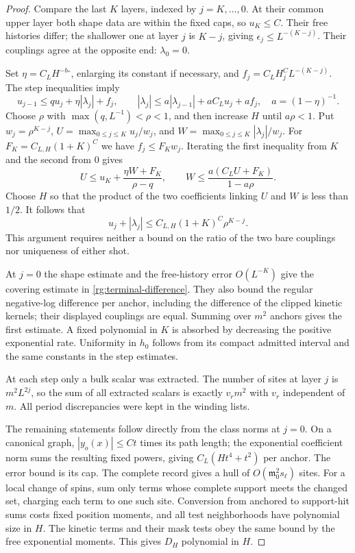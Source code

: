 \begin{proof}
Compare the last $K$ layers, indexed by $j=K,\ldots,0$.
At their common upper layer both shape data are within the
fixed caps, so $u_K\le C$.  Their free histories differ;
the shallower one at layer $j$ is $K-j$, giving
$\epsilon_j\le L^{-(K-j)}$.  Their couplings agree at the
opposite end: $\lambda_0=0$.

Set $\eta=C_LH^{-b_*}$, enlarging its constant if necessary,
and $f_j=C_LH_j^CL^{-(K-j)}$.  The step inequalities imply
\[
 u_{j-1}\le q u_j+\eta|\lambda_j|+f_j,\qquad
 |\lambda_j|\le
 a|\lambda_{j-1}|+aC_Lu_j+af_j,\quad
 a=(1-\eta)^{-1}.
\]
Choose $\rho$ with $\max(q,L^{-1})<\rho<1$, and then
increase $H$ until $a\rho<1$.  Put
$w_j=\rho^{K-j}$,
$U=\max_{0\le j\le K}u_j/w_j$, and
$W=\max_{0\le j\le K}|\lambda_j|/w_j$.
For $F_K=C_{L,H}(1+K)^C$ we have $f_j\le F_Kw_j$.
Iterating the first inequality from $K$ and the second
from $0$ gives
\[
 U\le u_K+\frac{\eta W+F_K}{\rho-q},\qquad
 W\le\frac{a(C_LU+F_K)}{1-a\rho}.
\]
Choose $H$ so that the product of the two coefficients
linking $U$ and $W$ is less than $1/2$.
It follows that
\begin{equation}
 u_j+|\lambda_j|
       \le C_{L,H}(1+K)^C\rho^{K-j}.
 \label{rg:two-end-bound}
\end{equation}
This argument requires neither a bound on the ratio of
the two bare couplings nor uniqueness of either shot.

At $j=0$ the shape estimate and the free-history error
$O(L^{-K})$ give the covering estimate in
\eqref{rg:terminal-difference}.  They also bound the
regular negative-log difference per anchor, including
the difference of the clipped kinetic kernels; their
displayed couplings are equal.  Summing over $m^2$ anchors
gives the first estimate.  A fixed polynomial in $K$
is absorbed by decreasing the positive exponential rate.
Uniformity in $h_0$ follows from its compact admitted
interval and the same constants in the step estimates.

At each step only a bulk scalar was extracted.  The number
of sites at layer $j$ is $m^2L^{2j}$, so the sum of all
extracted scalars is exactly $v_rm^2$ with $v_r$ independent
of $m$.  All period discrepancies were kept in the winding
lists.

The remaining statements follow directly from the class
norms at $j=0$.  On a canonical graph,
$|y_o(x)|\le Ct$ times its path length; the exponential
coefficient norm sums the resulting fixed powers, giving
$C_L(Ht^4+t^2)$ per anchor.  The error bound is its cap.
The complete record gives a hull of $O(\mathfrak m_0^2s_\ell)$ sites.
For a local change of spins, sum only terms whose complete
support meets the changed set, charging each term to one
such site.  Conversion from anchored to support-hit sums
costs fixed position moments, and all test neighborhoods
have polynomial size in $H$.  The kinetic terms and their
mask tests obey the same bound by the free exponential
moments.  This gives $D_H$ polynomial in $H$.
\end{proof}

